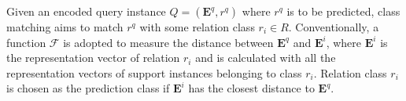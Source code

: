 Given an encoded query instance $Q=(\mathbf{E}^q, r^q)$ where $r^q$ is to be predicted, class matching aims to match $r^q$ with some relation class $r_i \in R$. Conventionally, a function $\mathcal{F}$ is adopted to measure the distance between $\mathbf{E}^q$ and $\mathbf{E}^{i}$, where $\mathbf{E}^{i}$ is the representation vector of relation $r_i$  and is calculated with all the representation vectors of support instances belonging to class $r_i$.
Relation class $r_i$ is chosen as the prediction class if $\mathbf{E}^i$ has the closest distance to $\mathbf{E}^q$.





